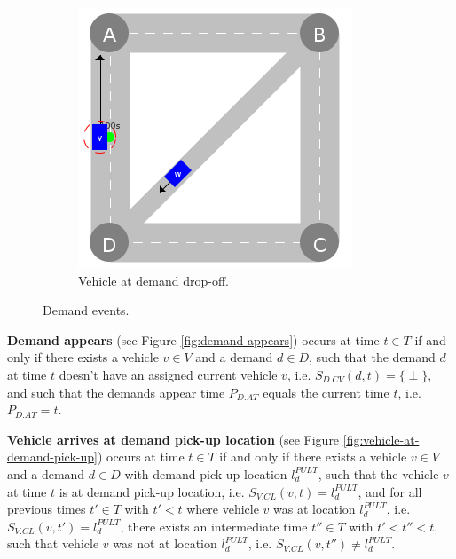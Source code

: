\documentclass[graybox]{svmult}
\begin{document}
\begin{figure}
\begin{subfigure}{.32\textwidth}
		\centering
		\includegraphics[scale=0.35]{../../events/vehicle-at-demand-drop-off.png}
		\caption{Vehicle at demand drop-off.}
		\label{fig:vehicle-at-demand-drop-off}
	\end{subfigure}
\hfill
	\caption{Demand events.}
	\label{fig:demand-events}	
\end{figure}


\noindent
\textbf{Demand appears} (see Figure \ref{fig:demand-appears}) 
occurs at time $t \in T$ if and only if there exists a vehicle $v \in V$ and a demand $d \in D$, such that the demand $d$ at time $t$ doesn't have an assigned current vehicle $v$, i.e. $S_{D.CV}(d, t) = \{\perp\}$, and such that the demands appear time $P_{D.AT}$ equals the current time $t$, i.e. $P_{D.AT} = t$.

\vspace{4mm}

\noindent
\textbf{Vehicle arrives at demand pick-up location} (see Figure \ref{fig:vehicle-at-demand-pick-up}) 
occurs at time $t \in T$ if and only if there exists a vehicle $v \in V$ and a demand $d \in D$ with demand pick-up location $l_d^{PULT}$, such that the vehicle $v$ at time $t$ is at demand pick-up location, i.e. $S_{V.CL}(v, t) = l_d^{PULT}$, and for all previous times $t' \in T$ with $t' < t$ where vehicle $v$ was at location $l_d^{PULT}$, i.e. $S_{V.CL}(v, t') = l_d^{PULT}$, there exists an intermediate time $t'' \in T$ with $t' < t'' < t$, such that vehicle $v$ was not at location $l_d^{PULT}$, i.e. $S_{V.CL}(v, t'') \neq l_d^{PULT}$.

\end{document}
